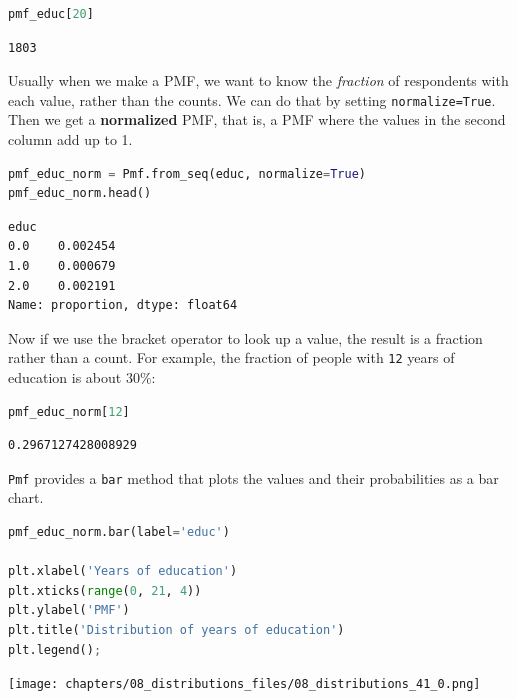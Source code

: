 \begin{lstlisting}[language=Python,style=source]
pmf_educ[20]
\end{lstlisting}

\begin{lstlisting}[style=output]
1803
\end{lstlisting}

Usually when we make a PMF, we want to know the \emph{fraction} of
respondents with each value, rather than the counts. We can do that by
setting \passthrough{\lstinline!normalize=True!}. Then we get a
\textbf{normalized} PMF, that is, a PMF where the values in the second
column add up to 1.

\begin{lstlisting}[language=Python,style=source]
pmf_educ_norm = Pmf.from_seq(educ, normalize=True)
pmf_educ_norm.head()
\end{lstlisting}

\begin{lstlisting}[style=output]
educ
0.0    0.002454
1.0    0.000679
2.0    0.002191
Name: proportion, dtype: float64
\end{lstlisting}

Now if we use the bracket operator to look up a value, the result is a
fraction rather than a count. For example, the fraction of people with
\passthrough{\lstinline!12!} years of education is about \(30\%\):

\begin{lstlisting}[language=Python,style=source]
pmf_educ_norm[12]
\end{lstlisting}

\begin{lstlisting}[style=output]
0.2967127428008929
\end{lstlisting}

\passthrough{\lstinline!Pmf!} provides a \passthrough{\lstinline!bar!}
method that plots the values and their probabilities as a bar chart.

\begin{lstlisting}[language=Python,style=source]
pmf_educ_norm.bar(label='educ')

plt.xlabel('Years of education')
plt.xticks(range(0, 21, 4))
plt.ylabel('PMF')
plt.title('Distribution of years of education')
plt.legend();
\end{lstlisting}

\begin{center}
\texttt{[image: chapters/08\_distributions\_files/08\_distributions\_41\_0.png]}
\end{center}

